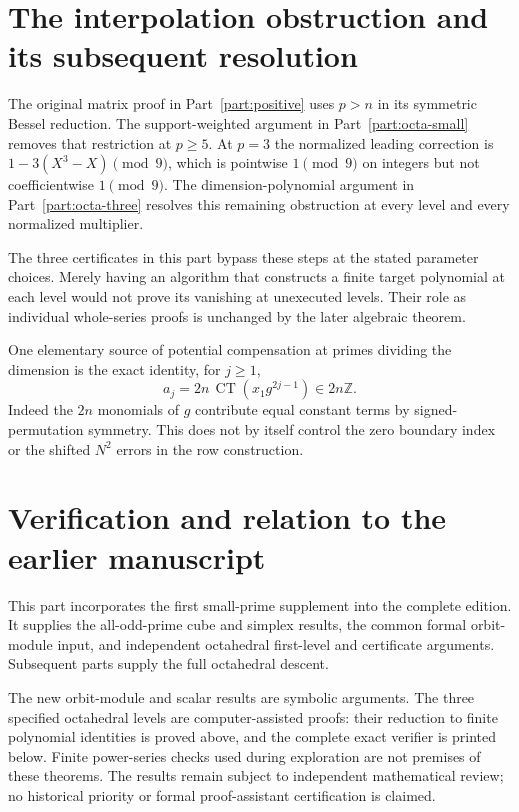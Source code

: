\documentclass[11pt,a4paper]{article}
\theoremstyle{definition}\newtheorem{definition}[theorem]{Definition}
\theoremstyle{remark}\newtheorem{remark}[theorem]{Remark}
\DeclareMathOperator{\CT}{CT}
\numberwithin{equation}{section}
\begin{document}
\section{The interpolation obstruction and its subsequent resolution}\label{SP:source-main-7}
The original matrix proof in Part~\ref{part:positive} uses $p>n$
in its symmetric Bessel reduction. The support-weighted argument in
Part~\ref{part:octa-small} removes that restriction at $p\ge5$.
At $p=3$ the normalized leading correction is
$1-3(X^3-X)\pmod9$, which is pointwise $1\pmod9$ on integers
but not coefficientwise $1\pmod9$. The dimension-polynomial
argument in Part~\ref{part:octa-three} resolves this remaining
obstruction at every level and every normalized multiplier.

The three certificates in this part bypass these steps at the stated
parameter choices. Merely having an algorithm that constructs a
finite target polynomial at each level would not prove its vanishing
at unexecuted levels. Their role as individual whole-series proofs
is unchanged by the later algebraic theorem.

One elementary source of potential compensation at primes dividing the
dimension is the exact identity, for $j\ge1$,
\[
a_j=2n\,\CT(x_1g^{2j-1})\in2n\mathbb Z.
\]
Indeed the $2n$ monomials of $g$ contribute equal constant terms by
signed-permutation symmetry. This does not by itself control the zero
boundary index or the shifted $N^2$ errors in the row construction.

\section{Verification and relation to the earlier manuscript}\label{SP:source-main-8}
This part incorporates the first small-prime supplement into the
complete edition. It supplies the all-odd-prime cube and simplex
results, the common formal orbit-module input, and independent
octahedral first-level and certificate arguments. Subsequent parts
supply the full octahedral descent.

The new orbit-module and scalar results are symbolic arguments.
The three specified octahedral levels are computer-assisted proofs:
their reduction to finite polynomial identities is proved above, and
the complete exact verifier is printed below. Finite power-series
checks used during exploration are not premises of these theorems.
The results remain subject to independent mathematical review; no
historical priority or formal proof-assistant certification is claimed.
\end{document}
